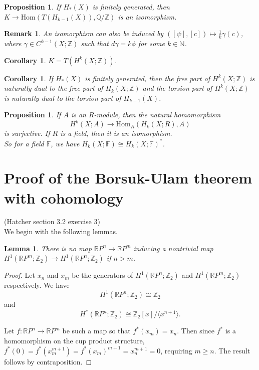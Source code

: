 \documentclass{article}
\newtheorem{lemma}[theorem]{Lemma}
\newtheorem{proposition}[theorem]{Proposition}
\newtheorem{corollary}[theorem]{Corollary}
\newtheorem{remark}[theorem]{Remark}
\begin{document}
\begin{proposition}
If $H_*(X)$ is finitely generated, then $K\to\text{Hom}(T(H_{k-1}(X)),\mathbb{Q}/\mathbb{Z})$ is an isomorphism.
\end{proposition}

\begin{remark}
An isomorphism can also be induced by $([\psi],[c])\mapsto\frac{1}{k}\gamma(c)$, where $\gamma\in C^{k-1}(X;\mathbb{Z})$ such that $d\gamma=k\phi$ for some $k\in\mathbb{N}$.
\end{remark}

\begin{corollary}
$K=T(H^k(X;\mathbb{Z}))$.
\end{corollary}
\begin{corollary}
If $H_*(X)$ is finitely generated, then the free part of $H^k(X;\mathbb{Z})$ is naturally dual to the free part of $H_k(X;\mathbb{Z})$ and the torsion part of $H^k(X;\mathbb{Z})$ is naturally dual to the torsion part of $H_{k-1}(X)$.
\end{corollary}

\begin{proposition}
If $A$ is an $R$-module, then the natural homomorphism\[H^k(X;A)\to\text{Hom}_R(H_k(X;R),A)\]is surjective. If $R$ is a field, then it is an isomorphism.\\
So for a field $\mathbb{F}$, we have $H_k(X;\mathbb{F})\cong H_k(X;\mathbb{F})^*$.
\end{proposition}

\section{Proof of the Borsuk-Ulam theorem with cohomology}

\textrm{(Hatcher section 3.2 exercise 3) \\}
We begin with the following lemmas.

\begin{lemma}
There is no map $\mathbb{R} P^n$$\rightarrow$$\mathbb{R} P^m$ inducing a nontrivial map $H^1(\mathbb{R} P^m;\mathbb{Z}_2)\rightarrow H^1(\mathbb{R} P^n;\mathbb{Z}_2)$ if $n>m$.
\end{lemma}
\begin{proof}
Let $x_n$ and $x_m$ be the generators of $H^1(\mathbb{R} P^n;\mathbb{Z}_2)$ and $H^1(\mathbb{R} P^m;\mathbb{Z}_2)$ respectively.
We have
\[H^1(\mathbb{R} P^n;\mathbb{Z}_2)\cong \mathbb{Z}_2\] and\[H^*(\mathbb{R} P^n;\mathbb{Z}_2)\cong \mathbb{Z}_2[x]/\langle x^{n+1}\rangle.\] 

\noindent Let $f\colon\mathbb{R} P^n\to\mathbb{R} P^m $ be such a map so that $f^*(x_m)=x_n$.
Then since $f^*$ is a homomorphism on the cup product structure, $f^*(0)=f^*(x_m^{m+1})=f^*(x_m)^{m+1}=x_n^{m+1}=0$, requiring $m \geq n$. The result follows by contraposition.
\end{proof}
\end{document}
